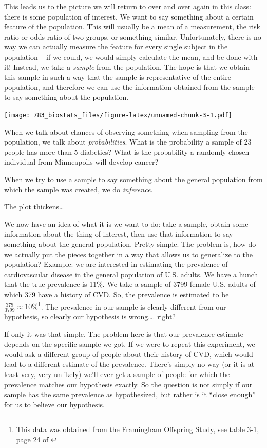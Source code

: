 \documentclass[]{book}
\let\rmarkdownfootnote\footnote%
\def\footnote{\protect\rmarkdownfootnote}
\theoremstyle{definition}
\theoremstyle{definition}
\theoremstyle{definition}
\theoremstyle{remark}
\begin{document}
This leads us to the picture we will return to over and over again in this class: there is some population of interest. We want to say something about a certain feature of the population. This will usually be a mean of a measurement, the risk ratio or odds ratio of two groups, or something similar. Unfortunately, there is no way we can actually measure the feature for every single subject in the population -- if we could, we would simply calculate the mean, and be done with it! Instead, we take a \emph{sample} from the population. The hope is that we obtain this sample in such a way that the sample is representative of the entire population, and therefore we can use the information obtained from the sample to say something about the population.

\texttt{[image: 783\_biostats\_files/figure-latex/unnamed-chunk-3-1.pdf]}

When we talk about chances of observing something when sampling from the population, we talk about \emph{probabilities}. What is the probability a sample of 23 people has more than 5 diabetics? What is the probability a randomly chosen individual from Minneapolis will develop cancer?

When we try to use a sample to say something about the general population from which the sample was created, we do \emph{inference}.

The plot thickens\ldots{}

We now have an idea of what it is we want to do: take a sample, obtain some information about the thing of interest, then use that information to say something about the general population. Pretty simple. The problem is, how do we actually put the pieces together in a way that allows us to generalize to the population? Example: we are interested in estimating the prevalence of cardiovascular disease in the general population of U.S. adults. We have a hunch that the true prevalence is 11\%. We take a sample of 3799 female U.S. adults of which 379 have a history of CVD. So, the prevalence is estimated to be \(\frac{379}{3799} \approx 10 \%\)\footnote{This data was obtained from the Framingham Offspring Study, see table 3-1, page 24 of \citet{ls}}. The prevalence in our sample is clearly different from our hypothesis, so clearly our hypothesis is wrong\ldots. right?

If only it was that simple. The problem here is that our prevalence estimate depends on the specific sample we got. If we were to repeat this experiment, we would ask a different group of people about their history of CVD, which would lead to a different estimate of the prevalence. There's simply no way (or it is at least very, very unlikely) we'll ever get a sample of people for which the prevalence matches our hypothesis exactly. So the question is not simply if our sample has the same prevalence as hypothesized, but rather is it ``close enough'' for us to believe our hypothesis.
\end{document}
